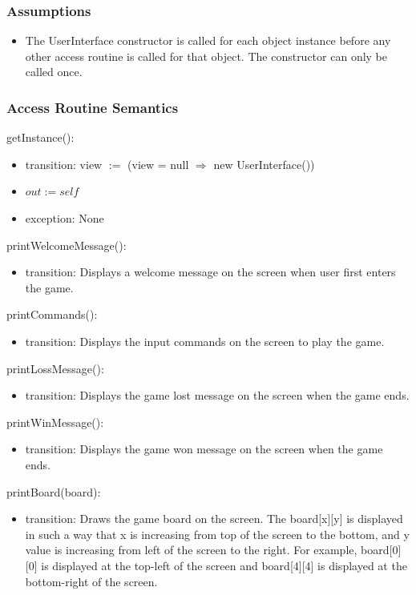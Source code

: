 \documentclass[12pt]{article}
\begin{document}
\subsubsection* {Assumptions}
\begin{itemize}
  \item The UserInterface constructor is called for each object instance before any other access routine is called for that object. The constructor can only be called once.
\end{itemize}

\subsubsection* {Access Routine Semantics}
getInstance():
\begin{itemize}
    \item transition: view $:=$ (view = null $\Rightarrow$ new UserInterface())
    \item $out := \mathit{self}$
    \item exception: None
\end{itemize}

\noindent printWelcomeMessage():
\begin{itemize}
    \item transition: Displays a welcome message on the screen when user first enters the game.
\end{itemize}

\noindent printCommands():
\begin{itemize}
    \item transition: Displays the input commands on the screen to play the game.
\end{itemize}

\noindent printLossMessage():
\begin{itemize}
    \item transition: Displays the game lost message on the screen when the game ends.
\end{itemize}

\noindent printWinMessage():
\begin{itemize}
    \item transition: Displays the game won message on the screen when the game ends.
\end{itemize}

\noindent printBoard(board):
\begin{itemize}
    \item transition: Draws the game board on the screen. The board[x][y] is displayed in such a way that x is increasing from top of the screen to the bottom, and y value is increasing from left of the screen to the right. For example, board[0][0] is displayed at the top-left of the screen and board[4][4] is displayed at the bottom-right of the screen.
\end{itemize}
\end{document}
